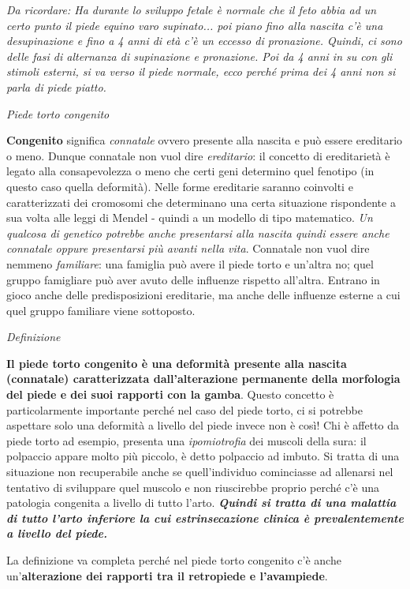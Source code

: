 \documentclass[]{article}
\begin{document}
\emph{Da ricordare: Ha durante lo sviluppo fetale è normale che il feto
abbia ad un certo punto il piede equino varo supinato... poi piano fino
alla nascita c'è una desupinazione e fino a 4 anni di età c'è un eccesso
di pronazione. Quindi, ci sono delle fasi di alternanza di supinazione e
pronazione. Poi da 4 anni in su con gli stimoli esterni, si va verso il
piede normale, ecco perché prima dei 4 anni non si parla di piede
piatto.}

\emph{Piede torto congenito}

\textbf{Congenito} significa \emph{connatale} ovvero presente alla
nascita e può essere ereditario o meno. Dunque connatale non vuol dire
\emph{ereditario}: il concetto di ereditarietà è legato alla
consapevolezza o meno che certi geni determino quel fenotipo (in questo
caso quella deformità). Nelle forme ereditarie saranno coinvolti e
caratterizzati dei cromosomi che determinano una certa situazione
rispondente a sua volta alle leggi di Mendel - quindi a un modello di
tipo matematico. \emph{Un qualcosa di genetico potrebbe anche
presentarsi alla nascita quindi essere anche connatale oppure
presentarsi più avanti nella vita}. Connatale non vuol dire nemmeno
\emph{familiare}: una famiglia può avere il piede torto e un'altra no;
quel gruppo famigliare può aver avuto delle influenze rispetto
all'altra. Entrano in gioco anche delle predisposizioni ereditarie, ma
anche delle influenze esterne a cui quel gruppo familiare viene
sottoposto.

\emph{Definizione}

\textbf{Il piede torto congenito è una deformità presente alla nascita
(connatale) caratterizzata dall'alterazione permanente della morfologia
del piede e dei suoi rapporti con la gamba}. Questo concetto è
particolarmente importante perché nel caso del piede torto, ci si
potrebbe aspettare solo una deformità a livello del piede invece non è
così! Chi è affetto da piede torto ad esempio, presenta una
\emph{ipomiotrofia} dei muscoli della sura: il polpaccio appare molto
più piccolo, è detto polpaccio ad imbuto. Si tratta di una situazione
non recuperabile anche se quell'individuo cominciasse ad allenarsi nel
tentativo di sviluppare quel muscolo e non riuscirebbe proprio perché
c'è una patologia congenita a livello di tutto l'arto.
\emph{\textbf{Quindi si tratta di una malattia di tutto l'arto inferiore
\emph{la cui estrinsecazione clinica è prevalentemente a livello del
piede.}} }

La definizione va completa perché nel piede torto congenito c'è anche
un'\textbf{alterazione dei rapporti tra il retropiede e l'avampiede}.
\end{document}
